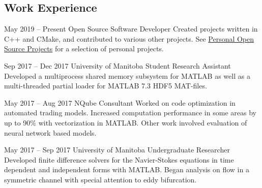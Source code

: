 \documentclass[
  9pt, %
]{FreemanCV}
\begin{document}
\begin{paracol}{2} %


\section{Work Experience}





\jobentry
  {May 2019 -- Present}
  {}
  {Open Source Software Developer}
  {Created projects written in C++ and CMake, and contributed to various other projects.
   See \hyperref[sec:Open Source]{Personal Open Source Projects} for a selection of
   personal projects.}

\jobentry
  {Sep 2017 -- Dec 2017} %
  {University of Manitoba} %
  {Student Research Assistant} %
  {Developed a multiprocess shared memory subsystem for MATLAB as well as a multi-threaded partial loader for MATLAB 7.3 HDF5 MAT-files.}


\jobentry
  {May 2017 -- Aug 2017} %
  {NQube} %
  {Consultant} %
  {Worked on code optimization in automated trading models. Increased computation performance in some areas by up to 90\% with vectorization in MATLAB. Other work involved evaluation of neural network based models.}


\jobentry
  {May 2017 -- Sep 2017} %
  {University of Manitoba} %
  {Undergraduate Researcher} %
  {Developed finite difference solvers for the Navier-Stokes equations in time dependent and independent forms with MATLAB. Began analysis on flow in a symmetric channel with special attention to eddy bifurcation.} %



\end{paracol}
\end{document}

